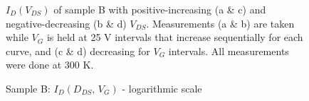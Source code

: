 \begin{figure}
\begin{centering}
{\begin{minipage}[t]{0.3\paperwidth}
\begin{flushright}
\par\end{flushright}%
\end{minipage}}\quad{}
\par\end{centering}
\begin{centering}
\caption{Sample B: $I_{D}\left(D_{DS},\,V_{G}\right)$ - logarithmic scale\label{fig:Sample-B-IDvsVDS-log}}
\par\end{centering}
$I_{D}\left(V_{DS}\right)$ of sample B with positive-increasing (a
\& c) and negative-decreasing (b \& d) $V_{DS}$. Measurements (a
\& b) are taken while $V_{G}$ is held at 25 V intervals that increase
sequentially for each curve, and (c \& d) decreasing for $V_{G}$
intervals. All measurements were done at 300 K.
\end{figure}


